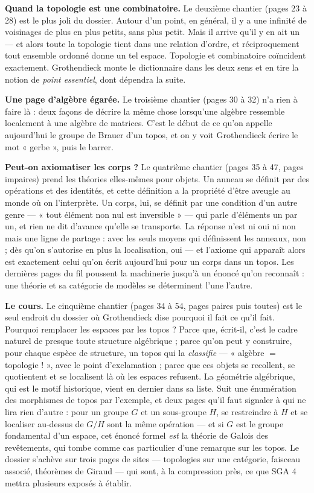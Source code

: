 \documentclass[11pt,a4paper]{article}
\begin{document}
\begin{resume}
\textbf{Quand la topologie est une combinatoire.} Le deuxième chantier
(pages 23 à 28) est le plus joli du dossier. Autour d'un point, en général, il
y a une infinité de voisinages de plus en plus petits, sans plus petit. Mais il
arrive qu'il y en ait un — et alors toute la topologie tient dans une relation
d'ordre, et réciproquement tout ensemble ordonné donne un tel espace. Topologie
et combinatoire coïncident exactement. Grothendieck monte le dictionnaire dans
les deux sens et en tire la notion de \emph{point essentiel}, dont dépendra la
suite.

\textbf{Une page d'algèbre égarée.} Le troisième chantier (pages 30 à 32) n'a
rien à faire là : deux façons de décrire la même chose lorsqu'une algèbre
ressemble localement à une algèbre de matrices. C'est le début de ce qu'on
appelle aujourd'hui le groupe de Brauer d'un topos, et on y voit Grothendieck
écrire le mot « gerbe », puis le barrer.

\textbf{Peut-on axiomatiser les corps ?} Le quatrième chantier (pages 35 à 47,
pages impaires) prend les théories elles-mêmes pour objets. Un anneau se
définit par des opérations et des identités, et cette définition a la propriété
d'être aveugle au monde où on l'interprète. Un corps, lui, se définit par une
condition d'un autre genre — « tout élément non nul est inversible » — qui parle
d'éléments un par un, et rien ne dit d'avance qu'elle se transporte. La réponse
n'est ni oui ni non mais une ligne de partage : avec les seuls moyens qui
définissent les anneaux, non ; dès qu'on s'autorise en plus la localisation,
oui — et l'axiome qui apparaît alors est exactement celui qu'on écrit
aujourd'hui pour un corps dans un topos. Les dernières pages du fil poussent la
machinerie jusqu'à un énoncé qu'on reconnaît : une théorie et sa catégorie de
modèles se déterminent l'une l'autre.

\textbf{Le cours.} Le cinquième chantier (pages 34 à 54, pages paires puis
toutes) est le seul endroit du dossier où Grothendieck dise pourquoi il fait ce
qu'il fait. Pourquoi remplacer les espaces par les topos ? Parce que, écrit-il,
c'est le cadre naturel de presque toute structure algébrique ; parce qu'on peut
y construire, pour chaque espèce de structure, un topos qui la \emph{classifie}
— « algèbre $=$ topologie ! », avec le point d'exclamation ; parce que ces
objets se recollent, se quotientent et se localisent là où les espaces
refusent. La géométrie algébrique, qui est le motif historique, vient en
dernier dans sa liste. Suit une énumération des morphismes de topos par
l'exemple, et deux pages qu'il faut signaler à qui ne lira rien d'autre : pour
un groupe $G$ et un sous-groupe $H$, se restreindre à $H$ et se localiser
au-dessus de $G/H$ sont la même opération — et si $G$ est le groupe fondamental
d'un espace, cet énoncé formel \emph{est} la théorie de Galois des revêtements,
qui tombe comme cas particulier d'une remarque sur les topos. Le dossier
s'achève sur trois pages de sites — topologies sur une catégorie, faisceau
associé, théorèmes de Giraud — qui sont, à la compression près, ce que SGA 4
mettra plusieurs exposés à établir.



\end{resume}
\end{document}
